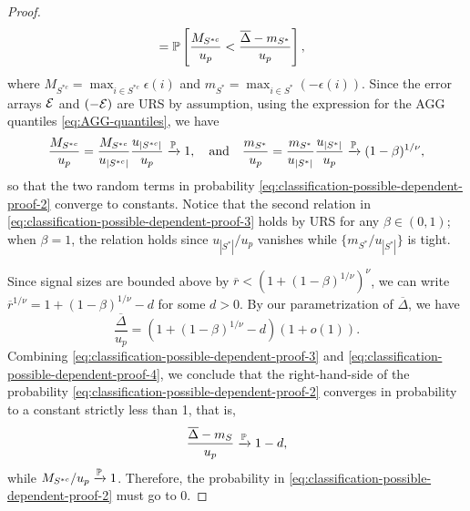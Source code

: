 \begin{proof}
\begin{align}
  &= \P\left[ \frac{M_{S^{*c}}}{u_p} < \frac{\overline{\Delta} - m_{S^*}}{u_p} \right], \label{eq:classification-possible-dependent-proof-2}
\end{align}
where $M_{S^{*c}} = \max_{i\in S^{*c}}\epsilon(i)$ and $m_{S^*} = \max_{i\in S^*}\left(-\epsilon(i)\right)$.
Since the error arrays ${\cal E}$ and $(-{\cal E})$ are URS by assumption, using the expression for the AGG quantiles \eqref{eq:AGG-quantiles}, we have
\begin{equation} \label{eq:classification-possible-dependent-proof-3}
    \frac{M_{S^{*c}}}{u_p} = \frac{M_{S^{*c}}}{u_{|S^{*c}|}} \frac{u_{|S^{*c}|}}{u_p} \xrightarrow{\P} 1,
\quad \text{and} \quad
\frac{m_{S^*}}{u_p} = \frac{m_{S^*}}{u_{|S^*|}} \frac{u_{|S^*|}}{u_p} \xrightarrow{\P} (1-\beta)^{1/\nu},
\end{equation}
so that the two random terms in probability \eqref{eq:classification-possible-dependent-proof-2} converge to constants.
Notice that the second relation in \eqref{eq:classification-possible-dependent-proof-3} holds by URS for any $\beta\in(0,1)$; when $\beta=1$, the relation holds since ${u_{|S^*|}}/{u_p}$ vanishes while $\{{m_{S^*}}/{u_{|S^*|}}\}$ is tight.

Since signal sizes are bounded above by $\overline{r} < \left(1 + (1-\beta)^{1/\nu}\right)^{\nu}$, we can write $\overline{r}^{1/\nu} = 1 + (1-\beta)^{1/\nu} - d$ for some $d > 0$. By our parametrization of $\overline{\Delta}$, we have
\begin{equation} \label{eq:classification-possible-dependent-proof-4}
    \frac{\overline{\Delta}}{u_p} = \left(1+(1-\beta)^{1/\nu}-d\right)(1+o(1)).
\end{equation}
Combining \eqref{eq:classification-possible-dependent-proof-3} and \eqref{eq:classification-possible-dependent-proof-4}, we conclude that the right-hand-side of the probability \eqref{eq:classification-possible-dependent-proof-2} converges in probability to a constant strictly less than 1, that is, 
\begin{equation}
    \frac{\overline{\Delta} - m_S}{u_p} \xrightarrow{\P} 1 - d,
\end{equation}
while ${M_{S^{*c}}}/{u_p} \xrightarrow{\P} 1$.
Therefore, the probability in \eqref{eq:classification-possible-dependent-proof-2} must go to 0.
\end{proof}


